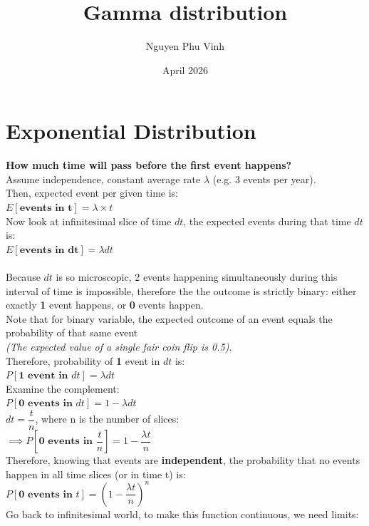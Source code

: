 \documentclass{article}
\title{Gamma distribution}
\author{Nguyen Phu Vinh}
\date{April 2026}
\begin{document}
\maketitle

\section{Exponential Distribution}

\textbf{How much time will pass before the first event happens?} \\

Assume independence, constant average rate $\lambda$ (e.g. 3 events per year). \\
Then, expected event per given time is: \\
$E[\textbf{events in t}] = \lambda \times t$ \\
Now look at infinitesimal slice of time $dt$, the expected events during that time $dt$ is: \\
$E[\textbf{events in dt}] = \lambda dt$ \\ \\
Because $dt$ is so microscopic, 2 events happening simultaneously during this interval of time is impossible, therefore the the outcome is strictly binary: either exactly \textbf{1} event happens, or \textbf{0} events happen. \\
Note that for binary variable, the expected outcome of an event equals the probability of that same event \\
\textit{(The expected value of a single fair coin flip is 0.5)}. \\
Therefore, probability of \textbf{1} event in $dt$ is: \\
$P[\textbf{1 event in $dt$}] = \lambda dt$ \\
Examine the complement: \\
$P[\textbf{0 events in $dt$}] = 1 - \lambda dt$ \\
 $dt = \dfrac{t}{n}$, where n is the number of slices: \\
$\implies P\left[ \textbf{0 events in }\dfrac{t}{n}\right] = 1 - \dfrac{\lambda t}{n}$\\
Therefore, knowing that events are \textbf{independent}, the probability that no events happen in all time slices (or in time t) is: \\
$P\left[ \textbf{0 events in }{t}\right] = \left(1 - \dfrac{\lambda t}{n}\right)^n$\\
Go back to infinitesimal world, to make this function continuous, we need limits: \\
\end{document}
